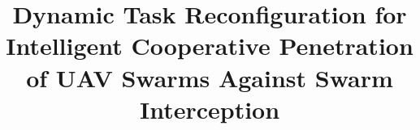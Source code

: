 \documentclass[unbranded]{cja}
\begin{document}
\title{Dynamic Task Reconfiguration for Intelligent Cooperative Penetration of UAV Swarms Against Swarm Interception}




\shortauthors{}


\frontheader{}

\end{document}
